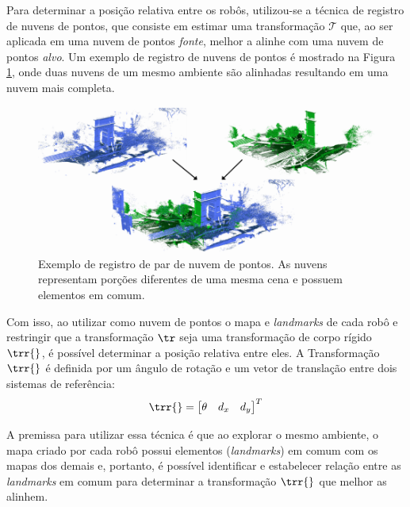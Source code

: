 Para determinar a posição relativa entre os robôs, utilizou-se a técnica 
de registro de nuvens de pontos, que consiste em estimar uma 
transformação $\mathcal{T}$ que, ao ser aplicada em uma nuvem de pontos 
\emph{fonte}, melhor a alinhe com uma nuvem de pontos \emph{alvo}. Um 
exemplo de registro de nuvens de pontos é mostrado na Figura 
\ref{fig:point-cloud-registration-example}, onde duas nuvens de um mesmo 
ambiente são alinhadas resultando em uma nuvem mais completa.

\begin{figure}[h]
  \centering
  \includegraphics[width=.7\textwidth]{figs/point-cloud-registration-example.png}
  \caption[Exemplo do registro de nuvem de pontos]{Exemplo de registro de par de nuvem de pontos. As nuvens representam porções diferentes de uma mesma cena e possuem elementos 
  em comum.}
  \label{fig:point-cloud-registration-example}
\end{figure}

Com isso, ao utilizar como nuvem de pontos o mapa 
e \textit{landmarks} de cada robô e restringir que a transformação $\tr$ seja uma transformação de corpo rígido $\trr{}$, é possível determinar 
a posição 
relativa entre eles. A Transformação $\trr{}$ é definida por um ângulo
de rotação e um vetor de translação entre dois sistemas de referência:
\begin{equation}
  \trr{} = \begin{bmatrix}
    \theta & d_x & d_y 
  \end{bmatrix}^T
  \label{eq:rigid-transform}
\end{equation}

A premissa para utilizar essa técnica é que ao 
explorar o mesmo ambiente, o mapa criado por cada robô possui 
elementos (\textit{landmarks}) em comum com 
os mapas dos demais e, portanto, é possível identificar e estabelecer 
relação entre as \textit{landmarks} em comum para determinar a 
transformação $\trr{}$ que melhor as alinhem.


